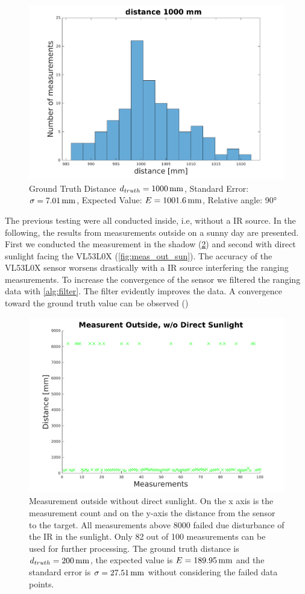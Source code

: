 \begin{figure}
	\centering
	\includegraphics[width=0.9\linewidth]{pictures/plot_dist1000.pdf}
	\caption{Ground Truth Distance $d_{truth}= \unit[1000]{mm}$, Standard Error: $\sigma=\unit[7.01]{mm}$, Expected Value: $E=\unit[1001.6]{mm}$, Relative angle: 90°}
	\label{fig:dist1000}
\end{figure}
The previous testing were all conducted inside, i.e, without a IR source. In the following, the results from measurements outside on a sunny day are presented. First we conducted the measurement in the shadow (\cref{fig:meas_out_shadow}) and second with direct sunlight facing the VL53L0X (\cref{fig:meas_out_sun}). The accuracy of the VL53L0X sensor worsens drastically with a IR source interfering the ranging measurements. To increase the convergence of the sensor we filtered the ranging data with \cref{alg:filter}. The filter evidently improves the data. A convergence toward the ground truth value can be observed ()
\begin{figure}
	\centering
	\includegraphics[width=0.9\linewidth]{pictures/plot_out_shadow.pdf}
	\caption{Measurement outside without direct sunlight. On the x axis is the measurement count and on the y-axis the distance from the sensor to the target. All measurements above 8000 failed due disturbance of the IR in the sunlight. Only 82 out of 100 measurements can be used for further processing. The ground truth distance is $d_{truth}=\unit[200]{mm}$, the expected value is $E=\unit[189.95]{mm}$ and the standard error is $\sigma=\unit[27.51]{mm}$ without considering the failed data points.}
	\label{fig:meas_out_shadow}
\end{figure}

